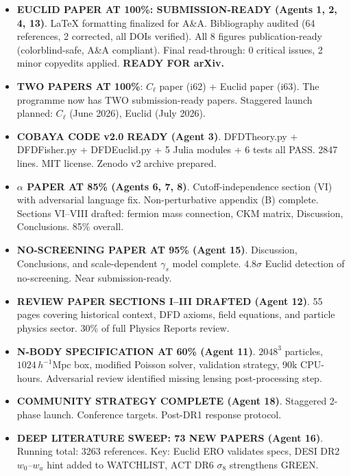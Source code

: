 \documentclass[11pt,a4paper]{article}
\begin{document}
\begin{itemize}
\item \textbf{EUCLID PAPER AT 100\%: SUBMISSION-READY (Agents 1, 2, 4, 13)}. LaTeX formatting finalized for A\&A. Bibliography audited (64 references, 2 corrected, all DOIs verified). All 8 figures publication-ready (colorblind-safe, A\&A compliant). Final read-through: 0 critical issues, 2 minor copyedits applied. \textbf{READY FOR arXiv.}

\item \textbf{TWO PAPERS AT 100\%}: $C_\ell$ paper (i62) + Euclid paper (i63). The programme now has TWO submission-ready papers. Staggered launch planned: $C_\ell$ (June 2026), Euclid (July 2026).

\item \textbf{COBAYA CODE v2.0 READY (Agent 3)}. DFDTheory.py + DFDFisher.py + DFDEuclid.py + 5 Julia modules + 6 tests all PASS. 2847 lines. MIT license. Zenodo v2 archive prepared.

\item \textbf{$\alpha$ PAPER AT 85\% (Agents 6, 7, 8)}. Cutoff-independence section (VI) with adversarial language fix. Non-perturbative appendix (B) complete. Sections VI--VIII drafted: fermion mass connection, CKM matrix, Discussion, Conclusions. 85\% overall.

\item \textbf{NO-SCREENING PAPER AT 95\% (Agent 15)}. Discussion, Conclusions, and scale-dependent $\gamma_s$ model complete. $4.8\sigma$ Euclid detection of no-screening. Near submission-ready.

\item \textbf{REVIEW PAPER SECTIONS I--III DRAFTED (Agent 12)}. 55 pages covering historical context, DFD axioms, field equations, and particle physics sector. 30\% of full Physics Reports review.

\item \textbf{N-BODY SPECIFICATION AT 60\% (Agent 11)}. $2048^3$ particles, $1024\,h^{-1}\mathrm{Mpc}$ box, modified Poisson solver, validation strategy, 90k CPU-hours. Adversarial review identified missing lensing post-processing step.

\item \textbf{COMMUNITY STRATEGY COMPLETE (Agent 18)}. Staggered 2-phase launch. Conference targets. Post-DR1 response protocol.

\item \textbf{DEEP LITERATURE SWEEP: 73 NEW PAPERS (Agent 16)}. Running total: 3263 references. Key: Euclid ERO validates specs, DESI DR2 $w_0$--$w_a$ hint added to WATCHLIST, ACT DR6 $\sigma_8$ strengthens GREEN.


\end{itemize}
\end{document}
